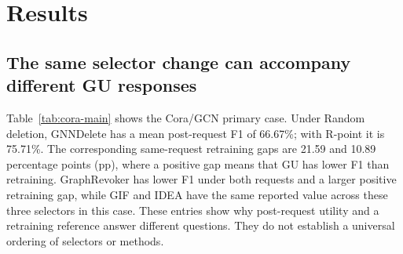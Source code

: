 \section{Results}
\label{sec:results}


\subsection{The same selector change can accompany different GU responses}
Table~\ref{tab:cora-main} shows the Cora/GCN primary case. Under Random deletion, GNNDelete has a mean post-request F1 of 66.67\%; with R-point it is 75.71\%. The corresponding same-request retraining gaps are 21.59 and 10.89 percentage points (pp), where a positive gap means that GU has lower F1 than retraining. GraphRevoker has lower F1 under both requests and a larger positive retraining gap, while GIF and IDEA have the same reported value across these three selectors in this case. These entries show why post-request utility and a retraining reference answer different questions. They do not establish a universal ordering of selectors or methods.

